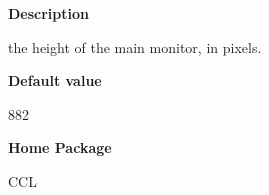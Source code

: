  
{\bf Description}

the height of the main monitor, in pixels.

 
{\bf Default value}

882

 
{\bf Home Package}

CCL

